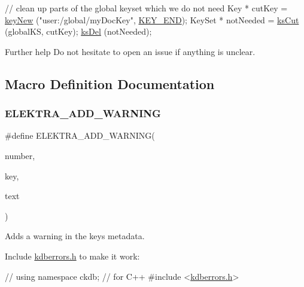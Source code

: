 \begin{DoxyCodeInclude}
        \textcolor{comment}{// clean up parts of the global keyset which we do not need}
        Key * cutKey = \hyperlink{group__key_gad23c65b44bf48d773759e1f9a4d43b89}{keyNew} (\textcolor{stringliteral}{"user:/global/myDocKey"}, \hyperlink{group__key_gga9b703ca49f48b482def322b77d3e6bc8aa8adb6fcb92dec58fb19410eacfdd403}{KEY\_END});
        KeySet * notNeeded = \hyperlink{group__keyset_ga6b00cf82b59af4d883a9bad6cf4a4a4a}{ksCut} (globalKS, cutKey);
        \hyperlink{group__keyset_ga27e5c16473b02a422238c8d970db7ac8}{ksDel} (notNeeded);
\end{DoxyCodeInclude}
 \begin{DoxyParagraph}{Further help}
Do not hesitate to open an issue if anything is unclear. 
\end{DoxyParagraph}


\subsection{Macro Definition Documentation}
\mbox{\label{group__plugin_ga3da3bdb0f41710adda9eee3d7adac9ff}} 
\subsubsection{\texorpdfstring{E\+L\+E\+K\+T\+R\+A\+\_\+\+A\+D\+D\+\_\+\+W\+A\+R\+N\+I\+NG}{ELEKTRA\_ADD\_WARNING}}
{\footnotesize\ttfamily \#define E\+L\+E\+K\+T\+R\+A\+\_\+\+A\+D\+D\+\_\+\+W\+A\+R\+N\+I\+NG(\begin{DoxyParamCaption}\item[{}]{number,  }\item[{}]{key,  }\item[{}]{text }\end{DoxyParamCaption})}



Adds a warning in the keys metadata. 

Include \hyperlink{kdberrors_8h}{kdberrors.\+h} to make it work\+:


\begin{DoxyCodeInclude}
\textcolor{comment}{// using namespace ckdb; // for C++}
\textcolor{preprocessor}{#include <\hyperlink{kdberrors_8h}{kdberrors.h}>}
\end{DoxyCodeInclude}



